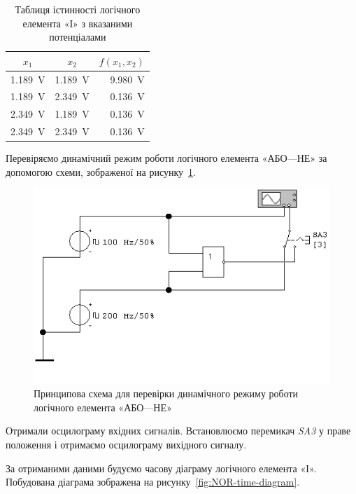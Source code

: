 \documentclass[a4paper,oneside,DIV=10,12pt]{scrartcl}
\newcommand\schel[1]{\textit{#1}}
\begin{document}
			\begin{table}[!htbp]
			\centering
				\begin{tabular}{ccr}
					\toprule
						$x_1$ & $x_2$ & $f(x_1, x_2)$\\
					\midrule
						\SI{1,189}{\volt} & \SI{1,189}{\volt} & \SI{9,980}{\volt}\\
						\SI{1,189}{\volt} & \SI{2,349}{\volt} & \SI{0,136}{\volt}\\
						\SI{2,349}{\volt} & \SI{1,189}{\volt} & \SI{0,136}{\volt}\\
						\SI{2,349}{\volt} & \SI{2,349}{\volt} & \SI{0,136}{\volt}\\
					\bottomrule
				\end{tabular}
			\caption{Таблиця істинності логічного елемента «І» з вказаними потенціалами}
			\label{fig:NAND-truth-table-potentials}
			\end{table}
			
			Перевіряємо динамічний режим роботи логічного елемента «АБО—НЕ» за допомогою схеми, зображеної на рисунку~\ref{fig:NOR-dynamic-mode-schematic}.
			
			\begin{figure}[!htbp]
			\centering
				\includegraphics[]{schematics/05-02-NOR.png}
			\caption{Принципова схема для перевірки динамічного режиму роботи логічного елемента «АБО—НЕ»}
			\label{fig:NOR-dynamic-mode-schematic}
			\end{figure}
			
			Отримали осцилограму вхідних сигналів. Встановлюємо перемикач \schel{SA3} у праве положення і отримаємо осцилограму вихідного сигналу.
			
			За отриманими даними будуємо часову діаграму логічного елемента «І». Побудована діаграма зображена на рисунку~\ref{fig:NOR-time-diagram}.
			
\end{document}
